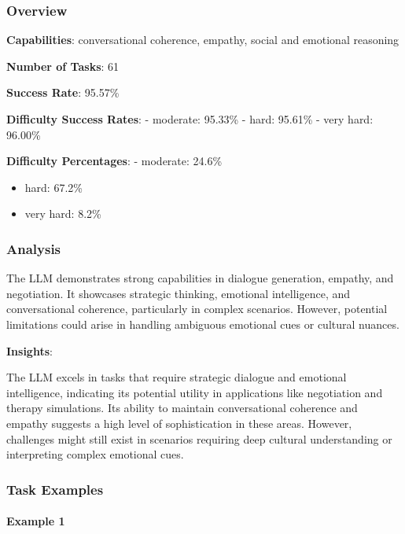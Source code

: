 \documentclass[fleqn,10pt]{wlscirep}
\begin{document}
\hypertarget{overview-7}{%
\subsubsection{Overview}\label{overview-7}}

\textbf{Capabilities}: conversational coherence, empathy, social and
emotional reasoning

\textbf{Number of Tasks}: 61

\textbf{Success Rate}: 95.57\%

\textbf{Difficulty Success Rates}: - moderate: 95.33\% - hard: 95.61\% -
very hard: 96.00\%

\textbf{Difficulty Percentages}: - moderate: 24.6\%

\begin{itemize}
\item
  hard: 67.2\%
\item
  very hard: 8.2\%
\end{itemize}

\hypertarget{analysis-6}{%
\subsubsection{Analysis}\label{analysis-6}}

The LLM demonstrates strong capabilities in dialogue generation,
empathy, and negotiation. It showcases strategic thinking, emotional
intelligence, and conversational coherence, particularly in complex
scenarios. However, potential limitations could arise in handling
ambiguous emotional cues or cultural nuances.

\textbf{Insights}:

The LLM excels in tasks that require strategic dialogue and emotional
intelligence, indicating its potential utility in applications like
negotiation and therapy simulations. Its ability to maintain
conversational coherence and empathy suggests a high level of
sophistication in these areas. However, challenges might still exist in
scenarios requiring deep cultural understanding or interpreting complex
emotional cues.

\hypertarget{task-examples-6}{%
\subsubsection{Task Examples}\label{task-examples-6}}

\hypertarget{example-1-6}{%
\paragraph{Example 1}\label{example-1-6}}
\end{document}
